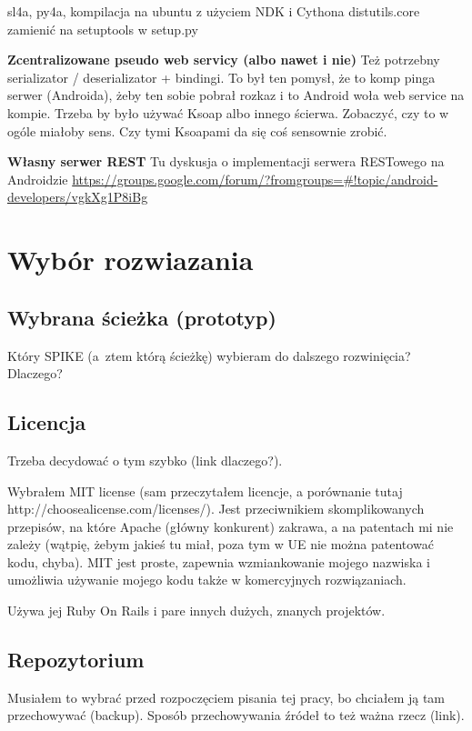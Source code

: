 sl4a, py4a, kompilacja na ubuntu z użyciem NDK i Cythona
distutils.core zamienić na setuptools w setup.py

\textbf{Zcentralizowane pseudo web servicy (albo nawet i nie)}
Też potrzebny serializator / deserializator + bindingi. To był ten pomysł, że to komp pinga serwer (Androida), żeby ten sobie pobrał rozkaz i to Android woła web service na kompie. Trzeba by było używać Ksoap albo innego ścierwa. Zobaczyć, czy to w ogóle miałoby sens. Czy tymi Ksoapami da się coś sensownie zrobić.

\textbf{Własny serwer REST}
Tu dyskusja o implementacji serwera RESTowego na Androidzie \url{https://groups.google.com/forum/?fromgroups=#!topic/android-developers/vgkXg1P8iBg}





\section{Wybór rozwiazania}
\subsection{Wybrana ścieżka (prototyp)}
Który SPIKE (a~ztem którą ścieżkę) wybieram do dalszego rozwinięcia?
Dlaczego?

\subsection{Licencja}
Trzeba decydować o tym szybko (link dlaczego?).

Wybrałem MIT license (sam przeczytałem licencje, a porównanie tutaj http://choosealicense.com/licenses/). Jest przeciwnikiem skomplikowanych przepisów, na które Apache (główny konkurent) zakrawa, a na patentach mi nie zależy (wątpię, żebym jakieś tu miał, poza tym w UE nie można patentować kodu, chyba). MIT jest proste, zapewnia wzmiankowanie mojego nazwiska i umożliwia używanie mojego kodu także w komercyjnych rozwiązaniach.

Używa jej Ruby On Rails i pare innych dużych, znanych projektów.

\subsection{Repozytorium}
Musiałem to wybrać przed rozpoczęciem pisania tej pracy, bo chciałem ją tam przechowywać (backup). Sposób przechowywania źródeł to też ważna rzecz (link).

